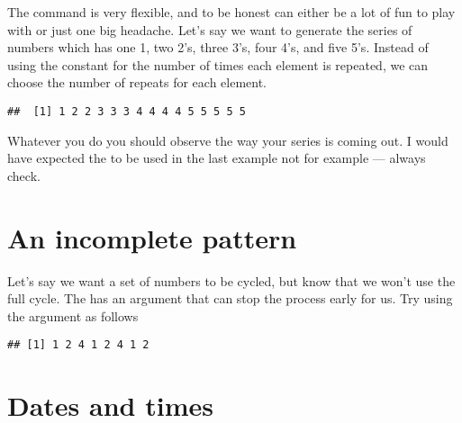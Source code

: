 The  command is very flexible, and to be honest can either be a lot of fun to play with or just one big headache. Let's say we want to generate the series of numbers which has one 1, two 2's, three 3's, four 4's, and five 5's. Instead of using the constant for the number of times each element is repeated, we can choose the number of repeats for each element. 
\begin{knitrout}
\color{fgcolor}\begin{kframe}
\begin{alltt}
\hlstd{(}\hlopt{:}\hlstd{,} \hlstd{=}\hlopt{:}\hlstd{)}
\end{alltt}
\begin{verbatim}
##  [1] 1 2 2 3 3 3 4 4 4 4 5 5 5 5 5
\end{verbatim}
\end{kframe}
\end{knitrout}
Whatever you do you should observe the way your series is coming out. I would have expected the  to be used in the last example not  for example --- always check. 
 
\section{An incomplete pattern} 
 
Let's say we want a set of numbers to be cycled, but know that we won't use the full cycle. The  has an argument that can stop the process early for us. Try using the  argument as follows 
\begin{knitrout}
\color{fgcolor}\begin{kframe}
\begin{alltt}
\hlstd{(}\hlstd{(}\hlstd{,}\hlstd{,}\hlstd{),} \hlstd{=}\hlstd{,} \hlstd{=}\hlstd{)}
\end{alltt}
\begin{verbatim}
## [1] 1 2 4 1 2 4 1 2
\end{verbatim}
\end{kframe}
\end{knitrout}
 
 
\section{Dates and times} 
 
